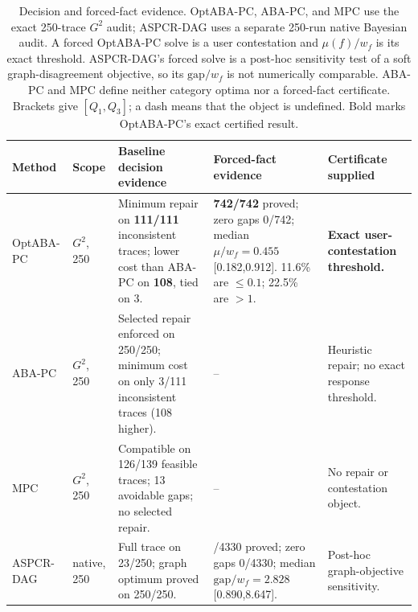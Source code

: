 \begin{table}[t]
\centering
\small
\begin{tabular}{@{}l>{\raggedright\arraybackslash}p{1.5cm}>{\raggedright\arraybackslash}p{4.0cm}>{\raggedright\arraybackslash}p{4.6cm}>{\raggedright\arraybackslash}p{3.1cm}@{}}
\toprule
Method & Scope & Baseline decision evidence & Forced-fact evidence & Certificate supplied \\
\midrule
OptABA-PC & $G^2$, 250 & Minimum repair on \textbf{111/111} inconsistent traces; lower cost than ABA-PC on \textbf{108}, tied on 3. & \textbf{742/742} proved; zero gaps 0/742; median $\mu/w_f=0.455$ [0.182,0.912]. 11.6\% are $\leq0.1$; 22.5\% are $>1$. & \textbf{Exact user-contestation threshold.} \\
ABA-PC & $G^2$, 250 & Selected repair enforced on 250/250; minimum cost on only 3/111 inconsistent traces (108 higher). & -- & Heuristic repair; no exact response threshold. \\
MPC & $G^2$, 250 & Compatible on 126/139 feasible traces; 13 avoidable gaps; no selected repair. & -- & No repair or contestation object. \\
ASPCR-DAG & native, 250 & Full trace on 23/250; graph optimum proved on 250/250. & 4330/4330 proved; zero gaps 0/4330; median $\mathrm{gap}/w_f=2.828$ [0.890,8.647]. & Post-hoc graph-objective sensitivity. \\
\bottomrule
\end{tabular}
\caption{Decision and forced-fact evidence. OptABA-PC, ABA-PC, and MPC use the exact 250-trace $G^2$ audit; ASPCR-DAG uses a separate 250-run native Bayesian audit. A forced OptABA-PC solve is a user contestation and $\mu(f)/w_f$ is its exact threshold. ASPCR-DAG's forced solve is a post-hoc sensitivity test of a soft graph-disagreement objective, so its $\mathrm{gap}/w_f$ is not numerically comparable. ABA-PC and MPC define neither category optima nor a forced-fact certificate. Brackets give $[Q_1,Q_3]$; a dash means that the object is undefined. Bold marks OptABA-PC's exact certified result.}
\label{tab:contestability-margin-comparison}
\end{table}
